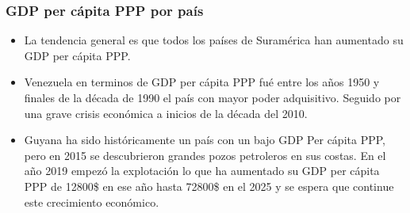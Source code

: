 \documentclass{beamer}
\begin{document}
\begin{frame}[fragile]
\frametitle{GDP per cápita PPP por país}

\begin{itemize}
\item<1> La tendencia general es que todos los países de Suramérica han aumentado su GDP per cápita PPP.

\item<2> Venezuela en terminos de GDP per cápita PPP fué entre los años 1950 y finales de la década de 1990 el país con mayor poder adquisitivo. Seguido por una grave crisis económica a inicios de la década del 2010.

\item<3> Guyana ha sido históricamente un país con un bajo GDP Per cápita PPP, pero en 2015 se descubrieron grandes pozos petroleros en sus costas. En el año 2019 empezó la explotación lo que ha aumentado su GDP per cápita PPP de 12800\$ en ese año hasta 72800\$ en el 2025 y se espera que continue este crecimiento económico.


\end{itemize}
\end{frame}
\end{document}
